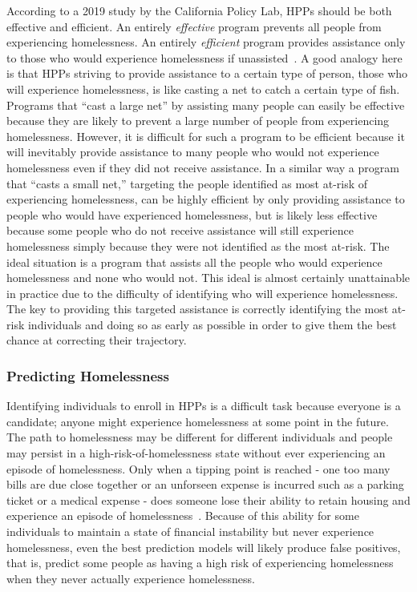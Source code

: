 \documentclass[10pt,letterpaper]{article}
\newcommand{\red}[1]{{\color{red}{#1}}}
\begin{document}
\red{better transition}
According to a 2019 study by the California Policy Lab, HPPs should be both effective and efficient. An entirely \textit{effective} program prevents all people from experiencing homelessness. An entirely \textit{efficient} program provides assistance only to those who would experience homelessness if unassisted~\cite{von2019predicting}. A good analogy here is that HPPs striving to provide assistance to a certain type of person, those who will experience homelessness, is like casting a net to catch a certain type of fish. Programs that ``cast a large net'' by assisting many people can easily be effective because they are likely to prevent a large number of people from experiencing homelessness. However, it is difficult for such a program to be efficient because it will inevitably provide assistance to many people who would not experience homelessness even if they did not receive assistance. In a similar way a program that ``casts a small net,'' targeting the people identified as most at-risk of experiencing homelessness, can be highly efficient by only providing assistance to people who would have experienced homelessness, but is likely less effective because some people who do not receive assistance will still experience homelessness simply because they were not identified as the most at-risk. The ideal situation is a program that assists all the people who would experience homelessness and none who would not. This ideal is almost certainly unattainable in practice due to the difficulty of identifying who will experience homelessness. The key to providing this targeted assistance is correctly identifying the most at-risk individuals and doing so as early as possible in order to give them the best chance at correcting their trajectory.

\subsubsection*{Predicting Homelessness}
Identifying individuals to enroll in HPPs is a difficult task because everyone is a candidate; anyone might experience homelessness at some point in the future. The path to homelessness may be different for different individuals and people may persist in a high-risk-of-homelessness state without ever experiencing an episode of homelessness. Only when a tipping point is reached - one too many bills are due close together or an unforseen expense is incurred such as a parking ticket or a medical expense - does someone lose their ability to retain housing and experience an episode of homelessness~\cite{o2004wrong}. Because of this ability for some individuals to maintain a state of financial instability but never experience homelessness, even the best prediction models will likely produce false positives, that is, predict some people as having a high risk of experiencing homelessness when they never actually experience homelessness.
\end{document}
